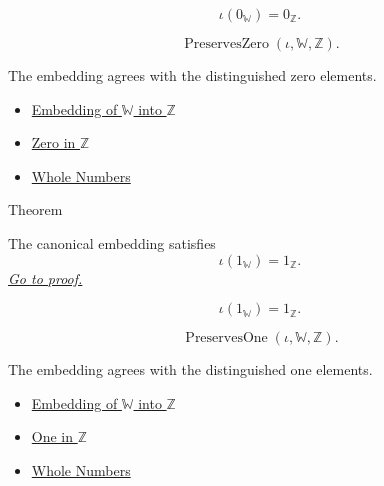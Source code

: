 \begin{remark*}
\[
\iota(0_{\mathbb{W}})=0_{\mathbb{Z}}.
\]
\end{remark*}

\begin{remark*}
\[
\operatorname{PreservesZero}(\iota,\mathbb{W},\mathbb{Z}).
\]
\end{remark*}

\begin{remark*}[Interpretation]
The embedding agrees with the distinguished zero elements.
\end{remark*}

\begin{dependencies}
\begin{itemize}
  \item \hyperref[def:canonical-embedding-w-into-z]{Embedding of $\mathbb{W}$ into $\mathbb{Z}$}
  \item \hyperref[def:zero-in-z]{Zero in $\mathbb{Z}$}
  \item \hyperref[def:whole-numbers]{Whole Numbers}
\end{itemize}
\end{dependencies}

\begin{theorembox}{Theorem}
\begin{theorem}
\label{thm:embedding-w-into-z-preserves-one}
The canonical embedding satisfies
\[
\iota(1_{\mathbb{W}})=1_{\mathbb{Z}}.
\]
\hyperref[prf:embedding-w-into-z-preserves-one]{\textit{Go to proof.}}
\end{theorem}
\end{theorembox}

\begin{remark*}
\[
\iota(1_{\mathbb{W}})=1_{\mathbb{Z}}.
\]
\end{remark*}

\begin{remark*}
\[
\operatorname{PreservesOne}(\iota,\mathbb{W},\mathbb{Z}).
\]
\end{remark*}

\begin{remark*}[Interpretation]
The embedding agrees with the distinguished one elements.
\end{remark*}

\begin{dependencies}
\begin{itemize}
  \item \hyperref[def:canonical-embedding-w-into-z]{Embedding of $\mathbb{W}$ into $\mathbb{Z}$}
  \item \hyperref[def:one-in-z]{One in $\mathbb{Z}$}
  \item \hyperref[def:whole-numbers]{Whole Numbers}
\end{itemize}
\end{dependencies}

